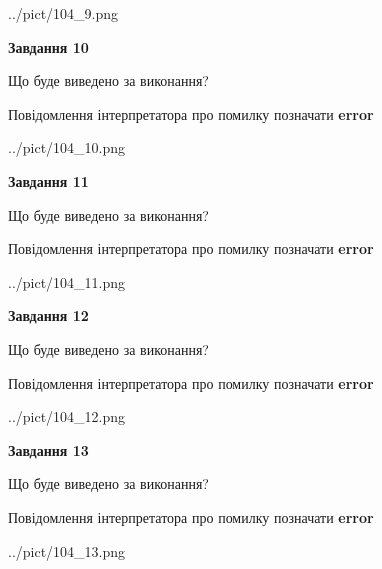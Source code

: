 \documentclass[11pt, ukrainian]{article}
\begin{document}
{\begin {large}
\begin{center}
	{../pict/104_9.png}
\end{center}
\newpage

{\begin {center}\textbf{Завдання 10}\end {center}}\par
Що буде виведено за виконання? \par
Повідомлення інтерпретатора про помилку позначати \textbf{error}

\begin{center}
	{../pict/104_10.png}
\end{center}
\newpage

{\begin {center}\textbf{Завдання 11}\end {center}}\par
Що буде виведено за виконання? \par
Повідомлення інтерпретатора про помилку позначати \textbf{error}

\begin{center}
	{../pict/104_11.png}
\end{center}
\newpage

{\begin {center}\textbf{Завдання 12}\end {center}}\par
Що буде виведено за виконання? \par
Повідомлення інтерпретатора про помилку позначати \textbf{error}

\begin{center}
	{../pict/104_12.png}
\end{center}
\newpage

{\begin {center}\textbf{Завдання 13}\end {center}}\par
Що буде виведено за виконання? \par
Повідомлення інтерпретатора про помилку позначати \textbf{error}

\begin{center}
	{../pict/104_13.png}
\end{center}
\newpage


\end{large}}
\end{document}
